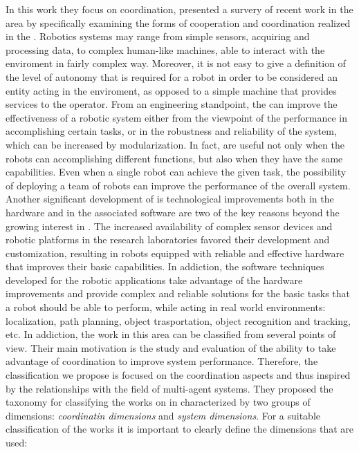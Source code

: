In this work \cite{focoo} they focus on \mrs coordination, presented a survery of recent 
work in the area by specifically examining the forms of cooperation and coordination realized 
in the \mrs.
Robotics systems may range from simple sensors, acquiring and processing data, to 
complex human-like machines, able to interact with the enviroment in fairly complex way. 
Moreover, it is not easy to give a definition of the level of autonomy that is required 
for a robot in order to be considered an entity acting in the enviroment, as opposed 
to a simple machine that provides services to the operator.
From an engineering standpoint,
the \mrs can improve the effectiveness of a robotic system either from the viewpoint 
of the performance in accomplishing
certain tasks, or in the robustness and reliability of the system,
which can be increased by modularization.
In fact, \mrs are useful not only when the robots can accomplishing different functions, but 
also when they have the same capabilities. Even when a single robot can achieve the given task,
the possibility of deploying a team of robots can improve the performance of the overall system.
Another significant development of \mrs is technological improvements both in the 
hardware and in the associated software are two of the key reasons beyond the growing
interest in \mrs. The increased availability of complex sensor devices and robotic platforms
in the research laboratories favored their development and customization, resulting
in robots equipped with reliable and effective hardware that improves their basic 
capabilities. In addiction, the software techniques developed for the robotic applications
take advantage of the hardware improvements and provide complex and reliable solutions for the basic 
tasks that a robot should be able to perform, while acting in real world environments:
localization, path planning, object trasportation, object recognition and tracking, etc. 
In addiction, the work in this area can be classified from several points of view. 
Their main motivation is the study and evaluation of the ability to take advantage
of coordination to improve system performance. Therefore,
the classification we propose is focused on the coordination aspects 
and thus inspired by the relationships with the field of multi-agent systems.
They proposed the taxonomy for classifying the works on \mrs in characterized by two 
groups of dimensions: \textit{coordinatin dimensions} and \textit{system dimensions}.
For a suitable classification of the works it is important to clearly define the dimensions
that are used:
